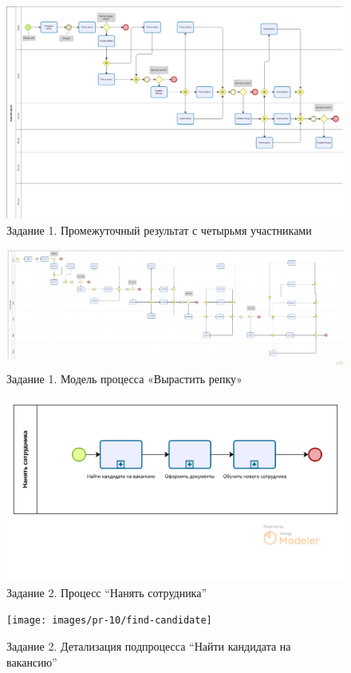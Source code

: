 \documentclass[a4paper,14pt]{extarticle}
\begin{document}


	\begin{figure}[htpb]
	\centering
	\includegraphics[width=0.8\linewidth]{images/pr10-repka1.2}
		\caption{Задание 1. Промежуточный результат с четырьмя участниками}
	\label{fig:pr10-repka1.2}
\end{figure}

\newpage	
	
	\begin{landscape}
	\begin{figure}[htpb]
		\centering
		\includegraphics[width=\linewidth]{images/pr10-repka1}
		\caption{Задание 1. Модель процесса «Вырастить репку»}
		\label{fig:pr10-repka1.3}
	\end{figure}
	
\end{landscape}

	\begin{figure}[htpb]
	\centering
	\includegraphics[width=0.5\linewidth]{images/pr-10/top}
	\caption{Задание 2. Процесс “Нанять сотрудника”}
	\label{fig:pr10-emp1}
\end{figure}
	\begin{figure}[htb]
	\centering
	\texttt{[image: images/pr-10/find-candidate]}
	\caption{Задание 2. Детализация подпроцесса “Найти кандидата на вакансию”}
	\label{fig:pr10-emp2}
\end{figure}
\end{document}
